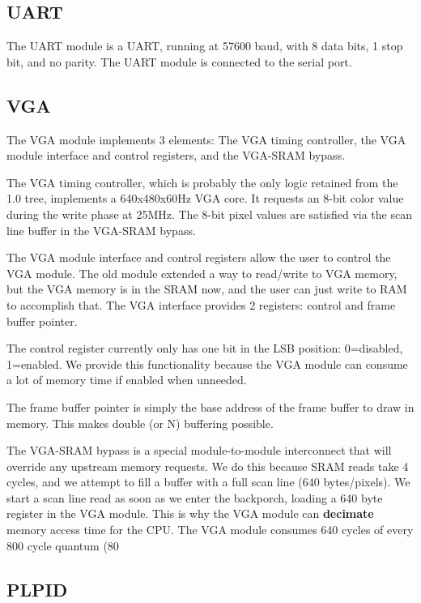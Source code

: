 \documentclass{article}
\begin{document}
\subsection{UART}
The UART module is a UART, running at 57600 baud, with 8 data bits, 1 stop bit, and no parity. The UART module is connected to the serial port.

\subsection{VGA}

The VGA module implements 3 elements: The VGA timing controller, the VGA module interface and control registers, and the VGA-SRAM bypass.

The VGA timing controller, which is probably the only logic retained from the 1.0 tree, implements a 640x480x60Hz VGA core. It requests an 8-bit color value during the write phase at 25MHz. The 8-bit pixel values are satisfied via the scan line buffer in the VGA-SRAM bypass.

The VGA module interface and control registers allow the user to control the VGA module. The old module extended a way to read/write to VGA memory, but the VGA memory is in the SRAM now, and the user can just write to RAM to accomplish that. The VGA interface provides 2 registers: control and frame buffer pointer.

The control register currently only has one bit in the LSB position: 0=disabled, 1=enabled. We provide this functionality because the VGA module can consume a lot of memory time if enabled when unneeded.

The frame buffer pointer is simply the base address of the frame buffer to draw in memory. This makes double (or N) buffering possible.

The VGA-SRAM bypass is a special module-to-module interconnect that will override any upstream memory requests. We do this because SRAM reads take 4 cycles, and we attempt to fill a buffer with a full scan line (640 bytes/pixels). We start a scan line read as soon as we enter the backporch, loading a 640 byte register in the VGA module. This is why the VGA module can \textbf{decimate} memory access time for the CPU. The VGA module consumes 640 cycles of every 800 cycle quantum (80%

\subsection{PLPID}
\end{document}
